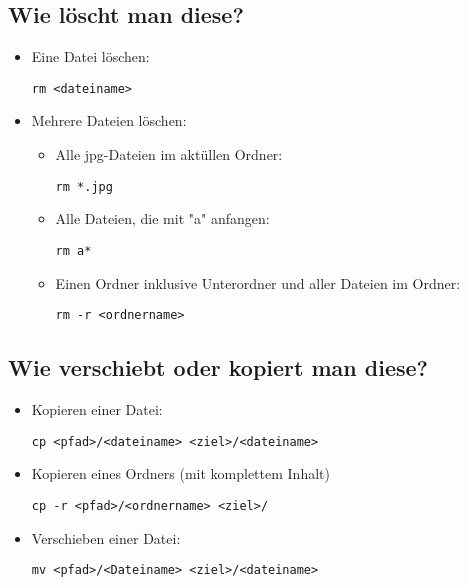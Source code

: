 \documentclass[a4paper,10pt]{article}
\newcommand{\befehl}[1]{
  \begin{center}
    \texttt{#1}
  \end{center}
}
\begin{document}
    \subsection{Wie löscht man diese?}
      \begin{itemize}
	\item Eine Datei löschen: 
	  \befehl{rm <dateiname>}
	\item Mehrere Dateien löschen:
	  \begin{itemize}
	    \item Alle jpg-Dateien im aktüllen Ordner: 
	      \befehl{rm *.jpg}
	    \item Alle Dateien, die mit "a" anfangen: 
	      \befehl{rm a*}
	    \item Einen Ordner inklusive Unterordner und aller Dateien im Ordner: 
	      \befehl{rm -r <ordnername>}
	  \end{itemize}
      \end{itemize}
    \subsection{Wie verschiebt oder kopiert man diese?}
      \begin{itemize} 
	\item Kopieren einer Datei: 
	  \befehl{cp <pfad>/<dateiname> <ziel>/<dateiname>}
	\item Kopieren eines Ordners (mit komplettem Inhalt)
	  \befehl{cp -r <pfad>/<ordnername> <ziel>/}
	\item Verschieben einer Datei:
	  \befehl{mv <pfad>/<Dateiname> <ziel>/<dateiname>}
      \end{itemize}
\end{document}

